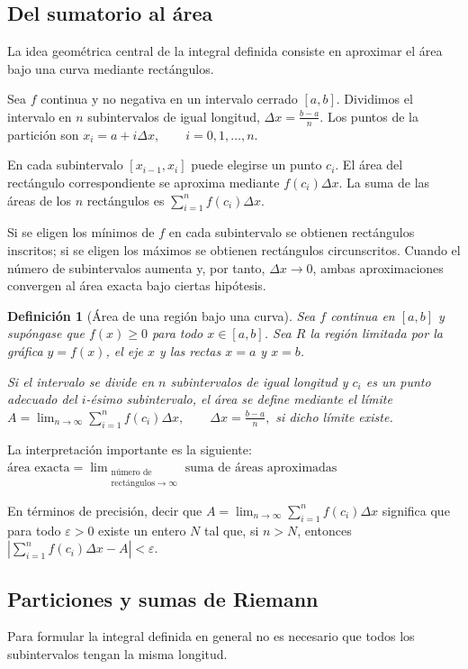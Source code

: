 \documentclass[12pt]{article}
\newtheorem{Def}{Definici\'on}
\begin{document}
\subsection*{Del sumatorio al área}
La idea geométrica central de la integral definida consiste en aproximar el
área bajo una curva mediante rectángulos.

Sea $f$ continua y no negativa en un intervalo cerrado $[a,b]$. Dividimos el
intervalo en $n$ subintervalos de igual longitud,
$
\Delta x=\frac{b-a}{n}.
$
Los puntos de la partición son
$
x_i=a+i\Delta x,
\qquad i=0,1,\dots,n.
$

En cada subintervalo $[x_{i-1},x_i]$ puede elegirse un punto $c_i$. El área del
rectángulo correspondiente se aproxima mediante
$
f(c_i)\Delta x.
$
La suma de las áreas de los $n$ rectángulos es
$
\sum_{i=1}^{n}f(c_i)\Delta x.
$

Si se eligen los mínimos de $f$ en cada subintervalo se obtienen rectángulos
inscritos; si se eligen los máximos se obtienen rectángulos circunscritos.
Cuando el número de subintervalos aumenta y, por tanto, $\Delta x\to0$, ambas
aproximaciones convergen al área exacta bajo ciertas hipótesis.

\begin{Def}[Área de una región bajo una curva]
Sea $f$ continua en $[a,b]$ y supóngase que $f(x)\ge0$ para todo
$x\in[a,b]$. Sea $R$ la región limitada por la gráfica $y=f(x)$, el eje $x$ y
las rectas $x=a$ y $x=b$.

Si el intervalo se divide en $n$ subintervalos de igual longitud y $c_i$ es un
punto adecuado del $i$-ésimo subintervalo, el área se define mediante el límite
$
A
=
\lim_{n\to\infty}
\sum_{i=1}^{n}f(c_i)\Delta x,
\qquad
\Delta x=\frac{b-a}{n},
$
si dicho límite existe.
\end{Def}

La interpretación importante es la siguiente:
$
\boxed{
\text{área exacta}
=
\lim_{\substack{\text{número de}\\\text{rectángulos}\to\infty}}
\text{suma de áreas aproximadas}
}
$

En términos de precisión, decir que
$
A=\lim_{n\to\infty}\sum_{i=1}^{n}f(c_i)\Delta x
$
significa que para todo $\varepsilon>0$ existe un entero $N$ tal que, si
$n>N$, entonces
$
\left|
\sum_{i=1}^{n}f(c_i)\Delta x-A
\right|
<\varepsilon.
$
\subsection*{Particiones y sumas de Riemann}
Para formular la integral definida en general no es necesario que todos los
subintervalos tengan la misma longitud.
\end{document}
